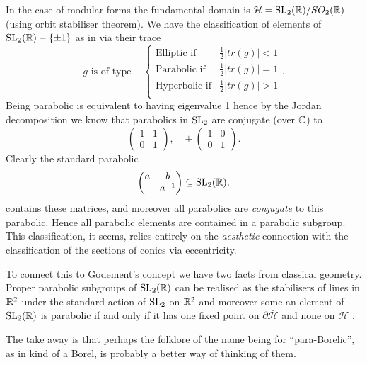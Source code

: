 \begin{Remark}
    In the case of modular forms the fundamental domain is \(\mathcal{H} = \SL_2(\R)/SO_2(\R)\) (using orbit stabiliser theorem). We have the classification of elements of  \(\SL_2(\R) -\{\pm 1\}\) as in \cite[3.5]{borelAutomorphicFormsSL21997} via their trace
    \[g\text{ is of type } \;\;\; 
    \begin{cases}
        \text{Elliptic if} & \frac{1}{2}|tr(g)| < 1 \\
        \text{Parabolic if} & \frac{1}{2}|tr(g)| = 1 \\
        \text{Hyperbolic if} & \frac{1}{2}|tr(g)| > 1 \\
    \end{cases}
    .\]
    Being parabolic is equivalent to having eigenvalue 1 hence by the Jordan decomposition we know that parabolics in \(\operatorname{SL}_2\) are conjugate (over \(\C\)) to 
    \[\begin{pmatrix}
        1 & 1\\
        0 & 1
    \end{pmatrix},\;\;\; \pm\begin{pmatrix}
        1 & 0\\
        0 & 1
    \end{pmatrix}.\]
    Clearly the standard parabolic 
    \[\begin{pmatrix}
        a & b \\
         & a\inv
    \end{pmatrix} \subseteq \SL_2(\R),\]
    contains these matrices, and moreover all parabolics are \textit{conjugate} to this parabolic. Hence all parabolic elements are contained in a parabolic subgroup. This classification, it seems, relies entirely on the \textit{aesthetic} connection with the classification of the sections of conics via eccentricity.

    To connect this to Godement's concept we have two facts from classical geometry. Proper parabolic subgroups of \(\SL_2(\R)\) can be realised as the stabilisers of lines in \(\R^2\) under the standard action of \(\operatorname{SL}_2\) on \(\R^2\) \cite[2.6]{borelAutomorphicFormsSL21997} and moreover some an element of \(\SL_2(\R)\) is parabolic if and only if it has one fixed point on \(\partial\bar{\mathcal{H}}\) and none on \(\mathcal{H}\) \cite[3.5]{borelAutomorphicFormsSL21997}. 

    The take away is that perhaps the folklore of the name being for ``para-Borelic'', as in kind of a Borel, is probably a better way of thinking of them.
\end{Remark}
